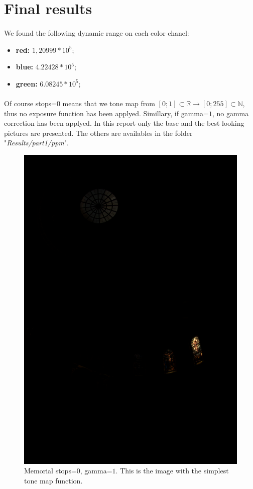 \documentclass[a4paper,12pt,oneside,final]{report}
\begin{document}
\section{Final results}
\paragraph{}
We found the following dynamic range on each color chanel:
\begin{itemize}
\item {\bf red:} $1,20999*10^5$;
\item {\bf blue:} $4.22428*10^5$;
\item {\bf green:} $6.08245*10^5$;
\end{itemize}
\paragraph{}
Of course stops=$0$ means that we tone map from $[0;1]\subset\mathbb{R}\to[0;255]\subset\mathbb{N}$, thus no exposure function has been applyed. Simillary, if gamma=$1$, no gamma correction has been applyed. In this report only the base and the best looking pictures are presented. The others are availables in the folder "\textit{Results/part1/ppm}".
\begin{figure}[!h]
\centering
\includegraphics[scale=0.8]{pictures/stops_0_gamma_1.png}
\caption{Memorial stops=$0$, gamma=$1$. This is the image with the simplest tone map function.}
\end{figure}
\end{document}
